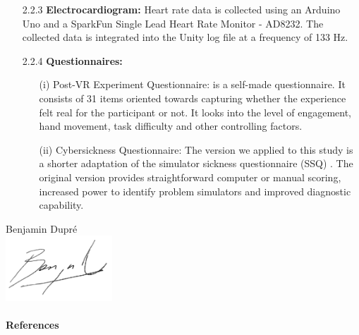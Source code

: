 \documentclass[12pt,oneside,openright]{report}
\begin{document}
\begin{enumerate}
    \item[2.2.3] \textbf{Electrocardiogram:} Heart rate data is collected using an Arduino Uno and a SparkFun Single Lead Heart Rate Monitor - AD8232. The collected data is integrated into the Unity log file at a frequency of 133 Hz.
\newpage
    \item[2.2.4] \textbf{Questionnaires:}
      \begin{enumerate}
        \item[(i)] Post-VR Experiment Questionnaire: is a self-made questionnaire. It consists of 31 items oriented towards capturing whether the experience felt real for the participant or not. It looks into the level of engagement, hand movement, task difficulty and other controlling factors. 
        \item[(ii)] Cybersickness Questionnaire: The version we applied to this study is a shorter adaptation of the simulator sickness questionnaire (SSQ) \cite*{SSQ93}. The original version provides straightforward computer or manual scoring, increased power to identify problem simulators and improved diagnostic capability.
    \end{enumerate}
  \end{enumerate}
\vspace*{3cm}
\hfill  
\begin{center}
  Benjamin Dupré \\ 
  \includegraphics[width=4cm]{firma.png}
\end{center}

\pagebreak
\paragraph{\textbf{References}}
\printbibliography[heading=none]
\end{document}
